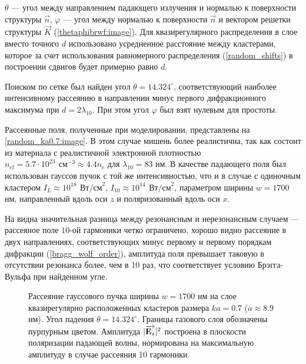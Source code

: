  $\theta$ --- угол между направлением падающего излучения и нормалью к поверхности структуры $\vec{n}$, $\varphi$ --- угол между нормалью к поверхности $\vec{n}$ и вектором решетки структуры $\vec{K}$ (\autoref{thetaphibrwf:image}). Для квазирегулярного распределения в слое вместо точного $d$ использовано усредненное расстояние между кластерами, которое за счет использования равномерного распределения (\autoref{random_shifts}) в построении сдвигов будет примерно равно $d$.


Поиском по сетке был найден угол $\theta = 14.324^{\circ}$, соответствующий наиболее интенсивному рассеянию в направлении минус первого дифракционного максимума при $d = 2\lambda_{10}$. При этом угол $\varphi$ был взят нулевым для простоты.

Рассеянные поля, полученные при моделировании, представлены на \autoref{random_ka0.7:image}. В этом случае мишень более реалистична, так как состоит из материала с реалистичной электронной плотностью $n_{el} = 5.7 \cdot 10^{23}\:\,\textrm{см}^{-3} \approx 4.4 n_{c}$ для $\lambda_{10} = 83$ нм. В качестве падающего поля был использован гауссов пучок с той же интенсивностью, что и в случае с одиночным кластером $I_{L} \approx 10^{18}\:\,\textrm{Вт/см}^2$, $I_{10} \approx 10^{14}\:\,\textrm{Вт/см}^2$, параметром ширины $w = 1700$ нм, направленный вдоль оси $z$ и поляризованный вдоль оси $x$.

На  видна значительная разница между резонансным и нерезонансным случаем --- рассеяное поле $10$-ой гармоники четко ограничено, хорошо видно рассеяние в двух направлениях, соответствующих минус первому и первому порядкам дифракции (\autoref{bragg_wolf_order}), амплитуда поля превышает таковую в отсутствии резонанса более, чем в 10 раз, что соответствует условию Брэгга-Вульфа при найденном угле.

    \begin{figure}[htb]
        \hfil
        \caption{Рассеяние гауссового пучка ширины $w = 1700$ нм на слое квазирегулярно расположенных кластеров размера $ka = 0.7$ ($a \approx 8.9$ нм). Угол падения $\theta = 14.324^{\circ}$. Границы газового слоя обозначены пурпурным цветом. Амплитуда $|\overrightarrow{\textbf{E}_{s}}|^2$ построена в плоскости поляризации падающей волны, нормирована на максимальную амплитуду в случае рассеяния 10 гармоники.}\label{random_ka0.7:image}
    \end{figure}

